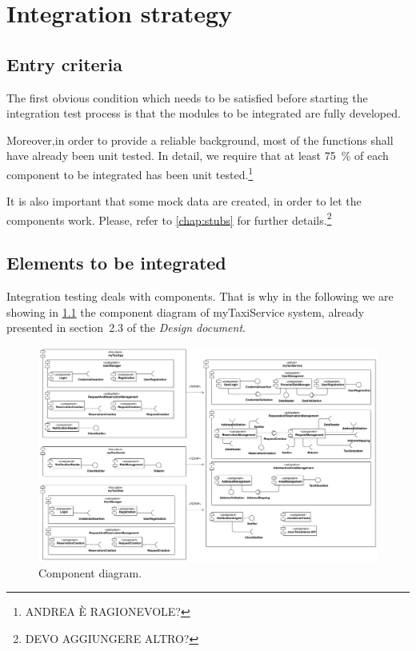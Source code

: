 \chapter{Integration strategy}\label{chap:strategy}

\section{Entry criteria}
The first obvious condition which needs to be satisfied before starting the integration test process is that the modules to be integrated are fully developed. 

Moreover,in order to provide a reliable background, most of the functions shall have already been unit tested. In detail, we require that at least \SI{75}{\percent} of each component to be integrated has been unit tested.\footnote{\color{red}ANDREA \`E RAGIONEVOLE?} 

It is also important that some mock data are created, in order to let the components work. Please, refer to \cref{chap:stubs} for further details.\footnote{\color{red}DEVO AGGIUNGERE ALTRO?}




\section{Elements to be integrated}
Integration testing deals with components. That is why in the following we are showing in \cref{fig:component} the component diagram of myTaxiService system, already presented in section~2.3 of the \emph{Design document}.

\begin{figure}%
	\centering%
	\includegraphics[width=\textwidth]{img/ComponentView__ComponentDiagram_1}%
	\caption{Component diagram.}%
	\label{fig:component}%
\end{figure}

